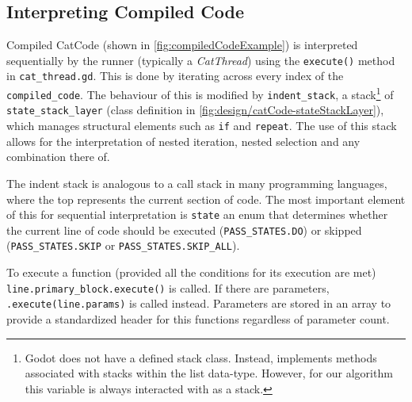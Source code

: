 \subsection{Interpreting Compiled Code}

Compiled CatCode (shown in \autoref{fig:compiledCodeExample}) is interpreted sequentially by the runner (typically a \textit{CatThread}) using the \texttt{execute()} method in \texttt{cat\_thread.gd}. This is done by iterating across every index of the \texttt{compiled\_code}. The behaviour of this is modified by \texttt{indent\_stack}, a stack\footnote{Godot does not have a defined stack class. Instead, implements methods associated with stacks within the list data-type. However, for our algorithm this variable is always interacted with as a stack.} of \texttt{state\_stack\_layer} (class definition in \autoref{fig:design/catCode-stateStackLayer}), which manages structural elements such as \texttt{if} and \texttt{repeat}. The use of this stack allows for the interpretation of nested iteration, nested selection and any combination there of.

The indent stack is analogous to a call stack in many programming languages, where the top represents the current section of code. The most important element of this for sequential interpretation is \texttt{state} an enum that determines whether the current line of code should be executed (\texttt{PASS\_STATES.DO}) or skipped (\texttt{PASS\_STATES.SKIP} or \texttt{PASS\_STATES.SKIP\_ALL}).

To execute a function (provided all the conditions for its execution are met) \texttt{line.primary\_block.execute()} is called. If there are parameters, \texttt{.execute(line.params)} is called instead. Parameters are stored in an array to provide a standardized header for this functions regardless of parameter count.

